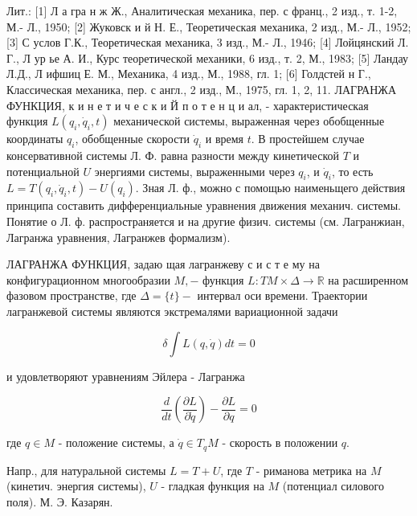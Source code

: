 \documentclass[10pt]{article}
\begin{document}
Лит.: [1] Л а гра н ж Ж., Аналитическая механика, пер. с франц., 2 изд., т. 1-2, М.- Л., 1950; [2] Жуковск и й Н. Е., Теоретическая механика, 2 изд., М.- Л., 1952; [3] С услов Г.К., Теоретическая механика, 3 изд., М.- Л., 1946; [4] Лойцянский Л. Г., Л ур ье А. И., Курс теоретической механики, 6 изд., т. 2, М., 1983; [5] Ландау Л.Д., Л ифшиц Е. М., Механика, 4 изд., М., 1988, гл. 1; [6] Голдстей н Г., Классическая механика, пер. с англ., 2 изд., М., 1975, гл. 1, 2, 11. ЛАГРАНЖА ФУНКЦИЯ, к и н е т и ч е с к и Й п о т е н ц и ал, - характеристическая функция $L\left(q_{i}, \dot{q}_{i}, t\right)$ механической системы, выраженная через обобщенные координаты $q_{i}$, обобщенные скорости $\dot{q}_{i}$ и время $t$. В простейшем случае консервативной системы Л. Ф. равна разности между кинетической $T$ и потенциальной $U$ энергиями системы, выраженными через $q_{i}$, и $\dot{q}_{i}$, то есть $L=T\left(q_{i}, \dot{q}_{i}, t\right)-U\left(q_{i}\right)$. Зная Л. ф., можно с помощью наименьщего действия принципа составить дифференциальные уравнения движения механич. системы. Понятие о Л. ф. распространяется и на другие физич. системы (см. Лагранжиан, Лагранжа уравнения, Лагранжев формализм).



ЛАГРАНЖА ФУНКЦИЯ, задаю щая лагранжеву с и с т е му на конфигурационном многообразии $M,-$ функция $L: T M \times \Delta \rightarrow \mathbb{R}$ на расширенном фазовом пространстве, где $\Delta=\{t\}-$ интервал оси времени. Траектории лагранжевой системы являются экстремалями вариационной задачи



\[

\delta \int L(q, \dot{q}) d t=0

\]



и удовлетворяют уравнениям Эйлера - Лагранжа



\[

\frac{d}{d t}\left(\frac{\partial L}{\partial \dot{q}}\right)-\frac{\partial L}{\partial q}=0

\]



где $q \in M$ - положение системы, а $\dot{q} \in T_{q} M$ - скорость в положении $q$.



Напр., для натуральной системы $L=T+U$, где $T$ - риманова метрика на $M$ (кинетич. энергия системы), $U$ - гладкая функция на $M$ (потенциал силового поля). М. Э. Казарян.
\end{document}

